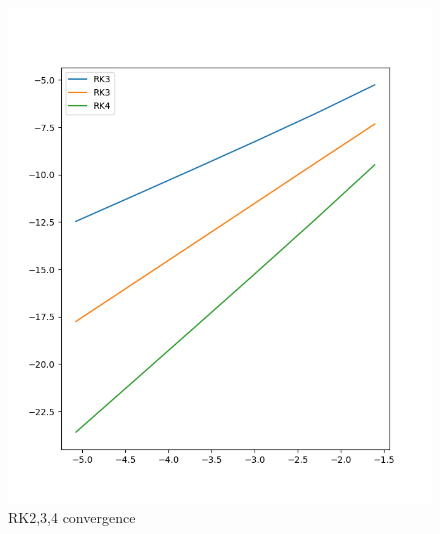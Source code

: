\documentclass[a4paper]{article}
\begin{document}
\begin{figure}[ht!]
\centering
\includegraphics[scale=0.5]{Figure_1.png}
\caption{RK2,3,4 convergence }
\label{fig:dig}
\end{figure}
\end{document}
